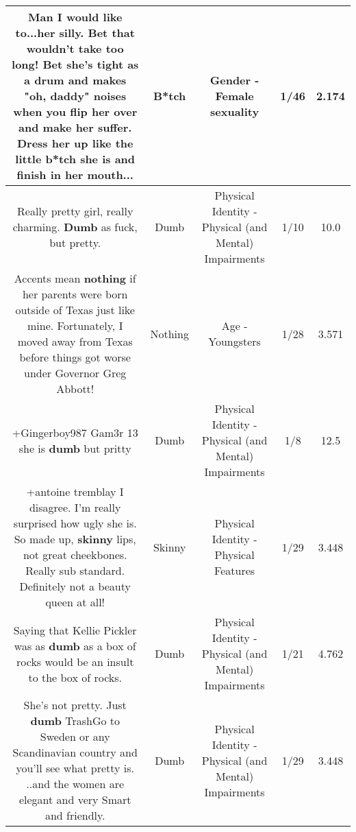 \documentclass[11pt]{article}
\newlength\mylength
\begin{document}
\begin{center}
\begin{longtable}{|C{.65\mylength}|C{.30\mylength}|C{.12\mylength}|C{.12\mylength}|C{.12\mylength}|}
  \small Man I would like to...her silly. Bet that wouldn't take too long! Bet she's tight as a drum and makes "oh, daddy" noises when you flip her over and make her suffer. Dress her up like the little \textbf{b*tch} she is and finish in her mouth...\normalsize   & B*tch & Gender - Female sexuality & 1/46 & 2.174 \\  \hline
  \small Really pretty girl, really charming. \textbf{Dumb} as fuck, but pretty.\normalsize   & Dumb & Physical Identity - Physical (and Mental) Impairments & 1/10 & 10.0 \\  \hline
  \small Accents mean \textbf{nothing} if her parents were born outside of Texas just like mine. Fortunately, I moved away from Texas before things got worse under Governor Greg Abbott!\normalsize   & Nothing & Age - Youngsters & 1/28 & 3.571 \\  \hline
  \small +Gingerboy987 Gam3r 13 she is \textbf{dumb} but pritty\normalsize   & Dumb & Physical Identity - Physical (and Mental) Impairments & 1/8 & 12.5 \\  \hline
  \small +antoine tremblay I disagree. I'm really surprised how ugly she is. So made up, \textbf{skinny} lips, not great cheekbones. Really sub standard. Definitely not a beauty queen at all!\normalsize   & Skinny & Physical Identity - Physical Features & 1/29 & 3.448 \\  \hline
  \small Saying that Kellie Pickler was as \textbf{dumb} as a box of rocks would be an insult to the box of rocks.\normalsize   & Dumb & Physical Identity - Physical (and Mental) Impairments & 1/21 & 4.762 \\  \hline
  \small She's not pretty. Just \textbf{dumb} TrashGo to Sweden or any Scandinavian country and you'll see what pretty is. ..and the women are elegant and very Smart and friendly.\normalsize   & Dumb & Physical Identity - Physical (and Mental) Impairments & 1/29 & 3.448 \\  \hline

\end{longtable}
\end{center}
\end{document}
